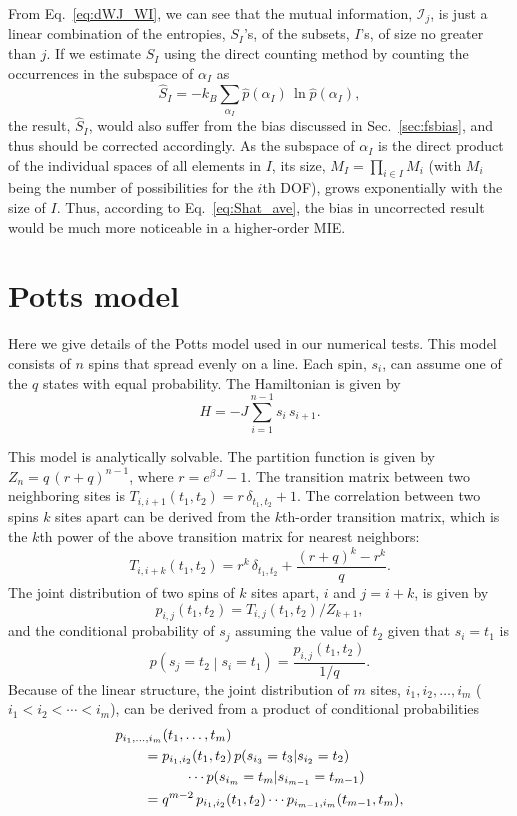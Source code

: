 \documentclass[reprint, superscriptaddress]{revtex4-1}
\newcommand{\MI}{\mathcal I} %
\begin{document}
From Eq.~\eqref{eq:dWJ_WI},
we can see that the mutual information, $\MI_j$, is just a linear combination
of the entropies, $S_I$'s,
of the subsets, $I$'s, of size no greater than $j$.
%
If we estimate $S_I$ using the direct counting method
by counting the occurrences in the subspace of $\alpha_I$ as
$$
\hat S_I = - k_B \sum_{\alpha_I} \hat p(\alpha_I) \, \ln \hat p(\alpha_I),
$$
the result, $\hat S_I$, would also suffer from the bias discussed
in Sec.~\ref{sec:fsbias}, and thus should be corrected accordingly.
%
As the subspace of $\alpha_I$ is the direct product of
the individual spaces of all elements in $I$,
its size, $M_I = \prod_{i \in I} M_i$
(with $M_i$ being the number of possibilities for the $i$th DOF),
grows exponentially with the size of $I$.
%
Thus, according to Eq.~\eqref{eq:Shat_ave},
the bias in uncorrected result would be much more noticeable
in a higher-order MIE.




\section{\label{sec:Potts}
Potts model
}

Here we give details of the Potts model used in our numerical tests.
%
This model consists of $n$ spins that spread evenly on a line.
%
Each spin, $s_i$, can assume one of the $q$ states with equal probability.
%
The Hamiltonian is given by
$$
H = -J \sum_{i = 1}^{n-1} s_i \, s_{i+1}.
$$

This model is analytically solvable. %
%
The partition function is given by
$Z_n = q \, (r + q)^{n-1}$,
where $r = e^{\beta \, J} - 1$.
%
The transition matrix between two neighboring sites is
$T_{i,i+1}(t_1, t_2) = r \, \delta_{t_1, t_2} + 1$.
%
The correlation between two spins $k$ sites apart
can be derived from the $k$th-order transition matrix,
which is the $k$th power of the above transition matrix
for nearest neighbors:
$$
T_{i,i+k}(t_1, t_2) = r^k \, \delta_{t_1, t_2}
+ \frac{ (r + q)^k - r^k } { q }.
$$
The joint distribution of two spins of $k$ sites apart, $i$ and $j = i+k$,
is given by
$$
p_{i, j}(t_1, t_2) = T_{i, j}(t_1, t_2) / Z_{k+1},
$$
and the conditional probability of $s_j$ assuming the value of $t_2$
given that $s_i = t_1$ is
$$
p\left(s_j = t_2 \middle| s_i = t_1 \right) = \frac{ p_{i, j}(t_1, t_2) } { 1/q }.
$$
Because of the linear structure,
the joint distribution of $m$ sites, $i_1, i_2, \dots, i_m$
($i_1 < i_2 < \cdots < i_m$),
can be derived from a product of conditional probabilities
\begin{align}
  &p_{i_1, \dots, i_m}(t_1,\dots,t_m)\
  \notag\\
  &\qquad
  = p_{i_1, i_2}(t_1,t_2) \,
  p(s_{i_3} = t_3 | s_{i_2} = t_2)
  \notag\\
  &\qquad \qquad \quad \cdots
  p(s_{i_{m}} = t_{m} | s_{i_{m-1}} = t_{m-1})
  \notag\\
  &\qquad
  =
  q^{m-2} \, p_{i_1, i_2}(t_1,t_2) \cdots p_{i_{m-1}, i_m}(t_{m-1}, t_m)
  ,
  \label{eq:Potts_jointp}
\end{align}
\end{document}
